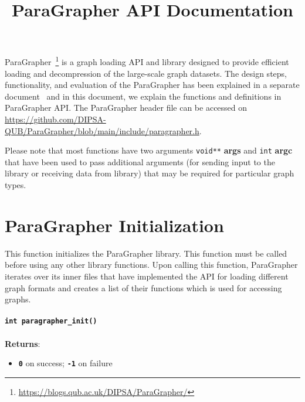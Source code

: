 \documentclass[a4paper]{article}
\title{\huge{ParaGrapher API Documentation}}
\begin{document}
\maketitle

ParaGrapher~\footnote{\url{https://blogs.qub.ac.uk/DIPSA/ParaGrapher/}} 
is a graph loading API and library designed to provide efficient loading and
decompression of the large-scale graph datasets. 
The design steps, functionality, and evaluation of the ParaGrapher has been explained in
a separate document~\cite{paragrapher-arxiv} and in this document, 
we explain the functions and definitions in ParaGrapher API. 
The ParaGrapher header file can be accessed on \url{https://github.com/DIPSA-QUB/ParaGrapher/blob/main/include/paragrapher.h}.

Please note that most functions have two arguments \verb|void**|  \textbf{args} and \verb|int| \textbf{argc} that
have been used to pass additional arguments (for sending input to the library or 
receiving data from library) that may be required for particular graph types. 

\section{ParaGrapher Initialization}
This function initializes the ParaGrapher library. This function must be called before using any other library functions.
Upon calling this function, ParaGrapher iterates over its inner files that have implemented
the API for loading different graph formats and creates a list of their functions which 
is used for accessing graphs.
\\
\\
\textbf{\texttt{int paragrapher\_init()}}
\\
\\
\textbf{Returns}:
\begin{itemize}
    \setlength{\itemsep}{0pt}
    \setlength{\parskip}{0pt}
    \setlength{\parsep}{0pt}

    \item \textbf{\texttt{0}} on success;  \textbf{\texttt{-1}} on failure
\end{itemize}


\end{document}
